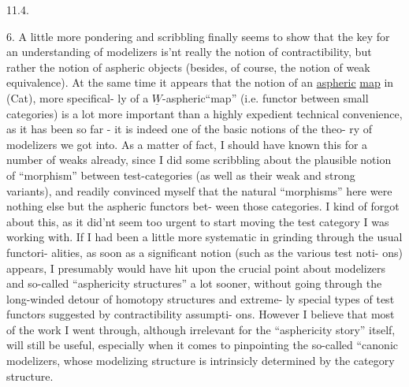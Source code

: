 11.4.

6.    A little more pondering and scribbling finally seems to show
that the  key for an understanding of modelizers is'nt really the
notion of contractibility,  but rather the notion of aspheric objects
(besides,  of course,  the notion of weak equivalence).  At the same time
it appears that the notion of an \uline{aspheric} \uline{map} in (Cat),  more specifical-%
ly of a $\underline{W}$-aspheric``map'' (i.e. functor between small categories) is
a lot more important than  a highly expedient technical convenience,  as
it has been so far  -  it is indeed one of the basic notions of the theo-%
ry of modelizers we got into.  As a matter of fact,  I should have known
this for a number of weaks already,  since I did some scribbling about
the plausible notion of ``morphism'' between test-categories (as well as
their weak and strong variants),  and readily convinced myself that the
natural ``morphisms'' here were nothing else but the aspheric functors bet-%
ween those categories.  I kind of forgot about this,  as it did'nt seem
too urgent to start moving  the test category I was working with.  If I 
had been a little more systematic in grinding through the usual functori-%
alities,  as soon as a significant notion (such as the various test noti-%
ons)  appears,  I presumably would have hit upon the crucial point about
modelizers and so-called ``asphericity structures'' a lot sooner,  without
going through the long-winded detour of homotopy structures\hand{,} and  extreme-%
ly special types of test functors suggested by contractibility assumpti-%
ons.  However  I believe that most of the work I went through,  
although irrelevant for the ``asphericity story'' itself,  will still be
useful,  especially when it comes to pinpointing the so-called ``canonic
modelizers,  whose modelizing structure is intrinsicly determined by the
category structure.

